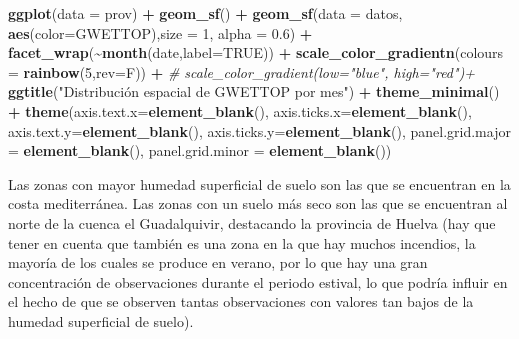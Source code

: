 \documentclass[12pt,a4paper,]{book}
\newenvironment{Shaded}{\begin{snugshade}}{\end{snugshade}}
\newcommand{\AttributeTok}[1]{\textcolor[rgb]{0.13,0.29,0.53}{#1}}
\newcommand{\CommentTok}[1]{\textcolor[rgb]{0.56,0.35,0.01}{\textit{#1}}}
\newcommand{\ConstantTok}[1]{\textcolor[rgb]{0.56,0.35,0.01}{#1}}
\newcommand{\DecValTok}[1]{\textcolor[rgb]{0.00,0.00,0.81}{#1}}
\newcommand{\FloatTok}[1]{\textcolor[rgb]{0.00,0.00,0.81}{#1}}
\newcommand{\FunctionTok}[1]{\textcolor[rgb]{0.13,0.29,0.53}{\textbf{#1}}}
\newcommand{\NormalTok}[1]{#1}
\newcommand{\SpecialCharTok}[1]{\textcolor[rgb]{0.81,0.36,0.00}{\textbf{#1}}}
\newcommand{\StringTok}[1]{\textcolor[rgb]{0.31,0.60,0.02}{#1}}
\numberwithin{dummy}{section}
\theoremstyle{ocrenumbox}
\theoremstyle{blacknumex}
\theoremstyle{blacknumbox}
\theoremstyle{ocrenum}
\theoremstyle{ocrenum}
\begin{document}
\begin{Shaded}
\begin{Highlighting}[]
\FunctionTok{ggplot}\NormalTok{(}\AttributeTok{data =}\NormalTok{ prov) }\SpecialCharTok{+} 
  \FunctionTok{geom\_sf}\NormalTok{() }\SpecialCharTok{+}
  \FunctionTok{geom\_sf}\NormalTok{(}\AttributeTok{data =}\NormalTok{ datos, }\FunctionTok{aes}\NormalTok{(}\AttributeTok{color=}\NormalTok{GWETTOP),}\AttributeTok{size =} \DecValTok{1}\NormalTok{, }\AttributeTok{alpha =} \FloatTok{0.6}\NormalTok{) }\SpecialCharTok{+}
  \FunctionTok{facet\_wrap}\NormalTok{(}\SpecialCharTok{\textasciitilde{}}\FunctionTok{month}\NormalTok{(date,}\AttributeTok{label=}\ConstantTok{TRUE}\NormalTok{)) }\SpecialCharTok{+} 
  \FunctionTok{scale\_color\_gradientn}\NormalTok{(}\AttributeTok{colours =} \FunctionTok{rainbow}\NormalTok{(}\DecValTok{5}\NormalTok{,}\AttributeTok{rev=}\NormalTok{F)) }\SpecialCharTok{+}
  \CommentTok{\# scale\_color\_gradient(low="blue", high="red")+}
  \FunctionTok{ggtitle}\NormalTok{(}\StringTok{"Distribución espacial de GWETTOP por mes"}\NormalTok{) }\SpecialCharTok{+}
  \FunctionTok{theme\_minimal}\NormalTok{() }\SpecialCharTok{+}
  \FunctionTok{theme}\NormalTok{(}\AttributeTok{axis.text.x=}\FunctionTok{element\_blank}\NormalTok{(),}
        \AttributeTok{axis.ticks.x=}\FunctionTok{element\_blank}\NormalTok{(),}
        \AttributeTok{axis.text.y=}\FunctionTok{element\_blank}\NormalTok{(),}
        \AttributeTok{axis.ticks.y=}\FunctionTok{element\_blank}\NormalTok{(),}
        \AttributeTok{panel.grid.major =} \FunctionTok{element\_blank}\NormalTok{(),}
        \AttributeTok{panel.grid.minor =} \FunctionTok{element\_blank}\NormalTok{())}
\end{Highlighting}
\end{Shaded}

Las zonas con mayor humedad superficial de suelo son las que se
encuentran en la costa mediterránea. Las zonas con un suelo más seco son
las que se encuentran al norte de la cuenca el Guadalquivir, destacando
la provincia de Huelva (hay que tener en cuenta que también es una zona
en la que hay muchos incendios, la mayoría de los cuales se produce en
verano, por lo que hay una gran concentración de observaciones durante
el periodo estival, lo que podría influir en el hecho de que se observen
tantas observaciones con valores tan bajos de la humedad superficial de
suelo).
\end{document}
